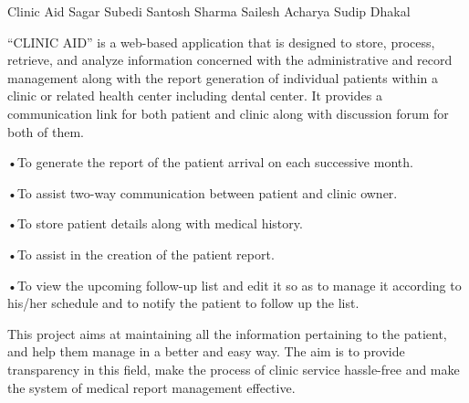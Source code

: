  \begin{conf-abstract}[]
 {Clinic Aid}
 { Sagar Subedi
 	Santosh Sharma
 	Sailesh Acharya
 	Sudip Dhakal
 }
{}

“CLINIC AID” is a web-based application that is designed to store, process, retrieve, and analyze information concerned with the administrative and record management along with the report generation of individual patients within a clinic or related health center including dental center. It provides a communication link for both patient and clinic along with discussion forum for both of them.

•To generate the report of the patient arrival on each successive month.  

•To assist two-way communication between patient and clinic owner. 
 
•To store patient details along with medical history.  

•To assist in the creation of the patient report.  

•To view the upcoming follow-up list and edit it so as to manage it according to his/her schedule and to notify the patient to follow up the list.   

This project aims at maintaining all the information pertaining to the patient, and help them manage in a better and easy way. The aim is to provide transparency in this field, make the process of clinic service hassle-free and make the system of medical report management effective.

\end{conf-abstract}
